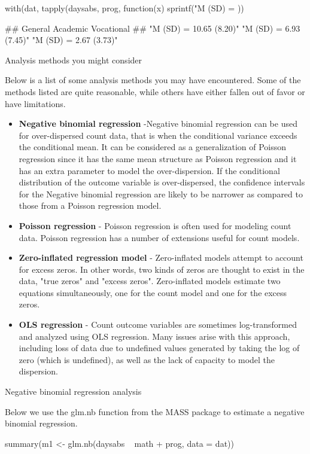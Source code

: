 with(dat, tapply(daysabs, prog, function(x) {
	sprintf("M (SD) = %
}))

##                 General                Academic              Vocational 
## "M (SD) = 10.65 (8.20)"  "M (SD) = 6.93 (7.45)"  "M (SD) = 2.67 (3.73)"

Analysis methods you might consider

Below is a list of some analysis methods you may have encountered. Some of the methods listed are quite reasonable, while others have either fallen out of favor or have limitations. 
\begin{itemize}
\item \textbf{Negative binomial regression} -Negative binomial regression can be used for over-dispersed count data, that is when the conditional variance exceeds the conditional mean. It can be considered as a generalization of Poisson regression since it has the same mean structure as Poisson regression and it has an extra parameter to model the over-dispersion. If the conditional distribution of the outcome variable is over-dispersed, the confidence intervals for the Negative binomial regression are likely to be narrower as compared to those from a Poisson regression model.
\item \textbf{Poisson regression }- Poisson regression is often used for modeling count data. Poisson regression has a number of extensions useful for count models. 
\item \textbf{Zero-inflated regression model} - Zero-inflated models attempt to account for excess zeros. In other words, two kinds of zeros are thought to exist in the data, "true zeros" and "excess zeros". Zero-inflated models estimate two equations simultaneously, one for the count model and one for the excess zeros.
\item \textbf{OLS regression }- Count outcome variables are sometimes log-transformed and analyzed using OLS regression. Many issues arise with this approach, including loss of data due to undefined values generated by taking the log of zero (which is undefined), as well as the lack of capacity to model the dispersion.
\end{itemize}
Negative binomial regression analysis

Below we use the glm.nb function from the MASS package to estimate a negative binomial regression.



summary(m1 <- glm.nb(daysabs ~ math + prog, data = dat))

